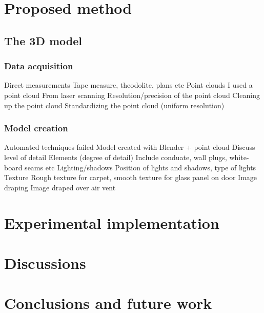 \documentclass[11pt,a4paper]{article}
\begin{document}
\newpage
\section{Proposed method}
	\subsection{The 3D model}
		\subsubsection{Data acquisition}
			Direct measurements
				Tape measure, theodolite, plans etc
			Point clouds
				I used a point cloud
				From laser scanning
				Resolution/precision of the point cloud
				Cleaning up the point cloud
				Standardizing the point cloud (uniform resolution)
		\subsubsection{Model creation}
			Automated techniques failed
			Model created with Blender + point cloud
			Discuss level of detail
				Elements (degree of detail)
					Include conduate, wall plugs, white-board seams etc
				Lighting/shadows
					Position of lights and shadows, type of lights
				Texture
					Rough texture for carpet, smooth texture for glass panel on door
				Image draping
					Image draped over air vent
					
				

\section{Experimental implementation}

\section{Discussions}

\section{Conclusions and future work}

\newpage
\printbibliography
\end{document}
